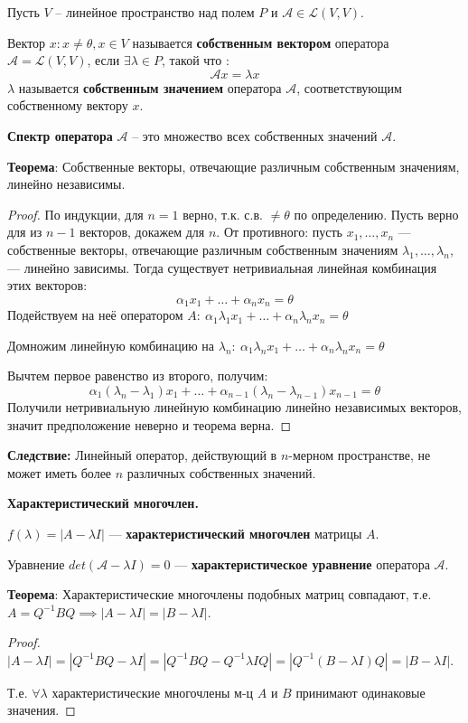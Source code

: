 Пусть $V$ -- линейное пространство над полем $P$ и $\mathcal{A} \in \mathcal{L}(V, V)$.

Вектор $x: x\neq \theta, x \in V$ называется \textbf{собственным вектором} оператора $\mathcal{A}  = \mathcal{L}(V, V)$, если $\exists \lambda \in P$, такой что : 
$$\mathcal{A}x = \lambda x$$
$\lambda$ называется \textbf{собственным значением} оператора $\mathcal{A}$, соответствующим собственному вектору $x$.

\textbf{Спектр оператора} $\mathcal{A}$ -- это множество всех собственных значений $\mathcal{A}$.

\textbf{Теорема}: Собственные векторы, отвечающие различным собственным значениям, линейно независимы.

\begin{proof}
По индукции, для $n=1$ верно, т.к. с.в. $\neq \theta$ по определению. Пусть верно для из $n-1$ векторов, докажем для $n$.
От противного: пусть $x_1,\dots,x_n$ --- собственные векторы, отвечающие различным собственным значениям $\lambda_1,\dots,\lambda_n$, --- линейно зависимы. 
Тогда существует нетривиальная линейная комбинация этих векторов:
$$ \alpha_1x_1+\dots+\alpha_nx_n=\theta$$
Подействуем на неё оператором $A:~\alpha_1\lambda_1x_1+\dots+\alpha_n\lambda_nx_n=\theta$

Домножим линейную комбинацию на $\lambda_n:~\alpha_1\lambda_nx_1+\dots+\alpha_n\lambda_nx_n=\theta$

Вычтем первое равенство из второго, получим:
$$\alpha_1(\lambda_n-\lambda_1)x_1+\dots+\alpha_{n-1}(\lambda_n-\lambda_{n-1})x_{n-1}=\theta$$
Получили нетривиальную линейную комбинацию линейно независимых векторов, значит предположение неверно и теорема верна.
\end{proof}

\textbf{Следствие:} Линейный оператор, действующий в $n$-мерном пространстве, не может иметь более $n$ различных собственных значений.


\centerline{\textbf{Характеристический многочлен.}}

$f(\lambda) = |A - \lambda I|$ --- \textbf{характеристический многочлен} матрицы $A$.

Уравнение $det(\mathcal{A} - \lambda I) = 0$ --- \textbf{характеристическое уравнение} оператора $\mathcal{A}$.

\textbf{Теорема}: Характеристические многочлены подобных матриц совпадают, т.е.
    $A = Q^{-1}BQ \implies |A - \lambda I| = |B - \lambda I|$.

\begin{proof}
$|A - \lambda I| = |Q^{-1} B Q - \lambda I| = |Q^{-1} B Q - Q^{-1} \lambda I Q| = |Q^{-1} (B - \lambda I) Q| = |B - \lambda I|$. 

Т.е. $\forall \lambda$ характеристические многочлены м-ц $A$ и $B$ принимают одинаковые значения.
\end{proof}


